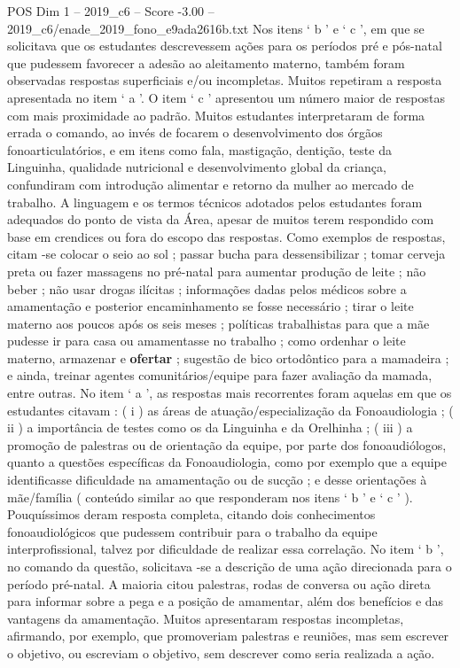\begin{textsample}{POS Dim 1 – 2019\_c6 – Score -3.00 – 2019\_c6/enade\_2019\_fono\_e9ada2616b.txt}
Nos itens ‘ b ’ e ‘ c ’, em que se solicitava que os estudantes descrevessem ações para os períodos pré e pós-natal que pudessem favorecer a adesão ao aleitamento materno, também foram observadas respostas superficiais e/ou incompletas.
Muitos repetiram a resposta apresentada no item ‘ a ’.
O item ‘ c ’ apresentou um número maior de respostas com mais proximidade ao padrão.
Muitos estudantes interpretaram de forma errada o comando, ao invés de focarem o desenvolvimento dos órgãos fonoarticulatórios, e em itens como fala, mastigação, dentição, teste da Linguinha, qualidade nutricional e desenvolvimento global da criança, confundiram com introdução alimentar e retorno da mulher ao mercado de trabalho.
A linguagem e os termos técnicos adotados pelos estudantes foram adequados do ponto de vista da Área, apesar de muitos terem respondido com base em crendices ou fora do escopo das respostas.
Como exemplos de respostas, citam -se colocar o seio ao sol ; passar bucha para dessensibilizar ; tomar cerveja preta ou fazer massagens no pré-natal para aumentar produção de leite ; não beber ; não usar drogas ilícitas ; informações dadas pelos médicos sobre a amamentação e posterior encaminhamento se fosse necessário ; tirar o leite materno aos poucos após os seis meses ; políticas trabalhistas para que a mãe pudesse ir para casa ou amamentasse no trabalho ; como ordenhar o leite materno, armazenar e \textbf{ofertar} ; sugestão de bico ortodôntico para a mamadeira ; e ainda, treinar agentes comunitários/equipe para fazer avaliação da mamada, entre outras.
No item ‘ a ’, as respostas mais recorrentes foram aquelas em que os estudantes citavam : ( i ) as áreas de atuação/especialização da Fonoaudiologia ; ( ii ) a importância de testes como os da Linguinha e da Orelhinha ; ( iii ) a promoção de palestras ou de orientação da equipe, por parte dos fonoaudiólogos, quanto a questões específicas da Fonoaudiologia, como por exemplo que a equipe identificasse dificuldade na amamentação ou de sucção ; e desse orientações à mãe/família ( conteúdo similar ao que responderam nos itens ‘ b ’ e ‘ c ’ ).
Pouquíssimos deram resposta completa, citando dois conhecimentos fonoaudiológicos que pudessem contribuir para o trabalho da equipe interprofissional, talvez por dificuldade de realizar essa correlação.
No item ‘ b ’, no comando da questão, solicitava -se a descrição de uma ação direcionada para o período pré-natal.
A maioria citou palestras, rodas de conversa ou ação direta para informar sobre a pega e a posição de amamentar, além dos benefícios e das vantagens da amamentação.
Muitos apresentaram respostas incompletas, afirmando, por exemplo, que promoveriam palestras e reuniões, mas sem escrever o objetivo, ou escreviam o objetivo, sem descrever como seria realizada a ação.

\end{textsample}
